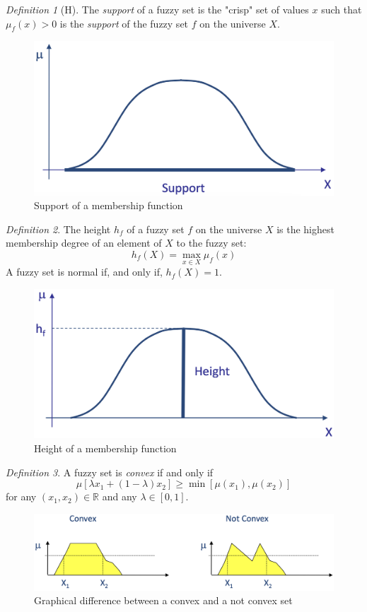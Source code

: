 \documentclass[12pt, a4paper]{report}
\theoremstyle{remark}
\newtheorem*{remark}{Definition}
\begin{document}
    \begin{remark}[H]
        The \emph{support} of a fuzzy set is the "crisp" set of values $x$ such that $\mu_f(x)>0$ is the \emph{support} of the fuzzy set
        $f$ on the universe $X$.
    \end{remark}
    \begin{figure}[H]
        \centering
        \includegraphics[width=0.5\linewidth]{images/support.png}
        \caption{Support of a membership function}
    \end{figure}
    \begin{remark}
        The height $h_f$ of a fuzzy set $f$ on the universe $X$ is the highest membership degree of an element of $X$ to the fuzzy set:
        \[h_f(X)=\max_{x \in X}\mu_f(x)\]
        A fuzzy set is normal if, and only if, $h_f(X)=1$.
    \end{remark}
    \begin{figure}[H]
        \centering
        \includegraphics[width=0.5\linewidth]{images/height.png}
        \caption{Height of a membership function}
    \end{figure}
    \begin{remark}
        A fuzzy set is \emph{convex} if and only if 
        \[\mu[\lambda x_1+(1-\lambda)x_2] \geq \min [\mu(x_1),\mu(x_2)]\]
        for any $(x_1,x_2) \in \mathbb{R}$ and any $\lambda \in [0,1]$.
    \end{remark}
    \begin{figure}[H]
        \centering
        \includegraphics[width=0.75\linewidth]{images/convex.png}
        \caption{Graphical difference between a convex and a not convex set}
    \end{figure}
\end{document}
